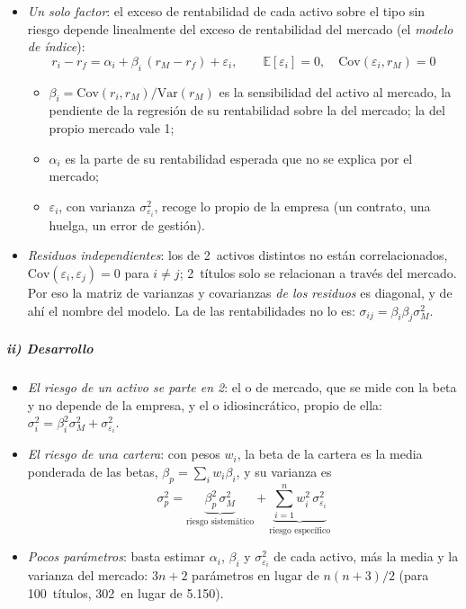 \documentclass[11pt]{article}
\begin{document}
\begin{itemize}
\item \emph{Un solo factor}: el exceso de rentabilidad de cada activo sobre el tipo sin riesgo depende linealmente del exceso de rentabilidad del mercado (el \emph{modelo de índice}):
  \begin{equation}\label{eq:modelo-indice}
  r_i-r_f=\alpha_i+\beta_i\,(r_M-r_f)+\varepsilon_i,\qquad \mathbb{E}[\varepsilon_i]=0,\quad \mathrm{Cov}(\varepsilon_i,r_M)=0
  \end{equation}
  \begin{itemize}
  \item $\beta_i=\mathrm{Cov}(r_i,r_M)/\mathrm{Var}(r_M)$ es la sensibilidad del activo al mercado, la pendiente de la regresión de su rentabilidad sobre la del mercado; la del propio mercado vale 1;
  \item $\alpha_i$ es la parte de su rentabilidad esperada que no se explica por el mercado;
  \item $\varepsilon_i$, con varianza $\sigma_{\varepsilon_i}^2$, recoge lo propio de la empresa (un contrato, una huelga, un error de gestión).
  \end{itemize}
\item \emph{Residuos independientes}: los de 2~activos distintos no están correlacionados, $\mathrm{Cov}(\varepsilon_i,\varepsilon_j)=0$ para $i\neq j$; 2~títulos solo se relacionan a través del mercado. Por eso la matriz de varianzas y covarianzas \emph{de los residuos} es diagonal, y de ahí el nombre del modelo. La de las rentabilidades no lo es: $\sigma_{ij}=\beta_i\beta_j\sigma_M^2$.
\end{itemize}

\subparagraph{ii) Desarrollo}

\begin{itemize}
\item \emph{El riesgo de un activo se parte en 2}: el  o de mercado, que se mide con la beta y no depende de la empresa, y el  o idiosincrático, propio de ella: $\sigma_i^2=\beta_i^2\sigma_M^2+\sigma_{\varepsilon_i}^2$.
\item \emph{El riesgo de una cartera}: con pesos $w_i$, la beta de la cartera es la media ponderada de las betas, $\beta_p=\sum_iw_i\beta_i$, y su varianza es
  \begin{equation}\label{eq:riesgo-sistematico}
  \sigma_p^2=\underbrace{\beta_p^2\,\sigma_M^2}_{\text{riesgo sistemático}}+\underbrace{\sum_{i=1}^{n}w_i^2\,\sigma_{\varepsilon_i}^2}_{\text{riesgo específico}}
  \end{equation}
\item \emph{Pocos parámetros}: basta estimar $\alpha_i$, $\beta_i$ y $\sigma_{\varepsilon_i}^2$ de cada activo, más la media y la varianza del mercado: $3n+2$ parámetros en lugar de $n(n+3)/2$ (para 100~títulos, 302~en lugar de 5.150).
\end{itemize}
\end{document}
